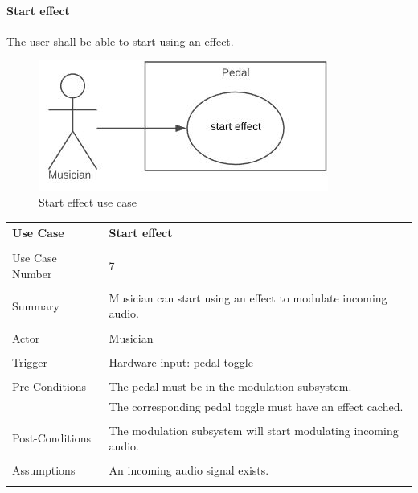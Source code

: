             \paragraph{Start effect} 
            The user shall be able to start using an effect.
            \begin{figure}[!ht]
                \centering
                \includegraphics[width=.5\textwidth]{diagrams/use_cases/uc-effect-start.JPG}
                \caption{Start effect use case}
                \label{fig:uc-start-effect}
            \end{figure}
            \clearpage
            \begin{table}[!ht]
                \centering
                \begin{tabular}{l l}
                    Use Case & Start effect \\
                    \hline \\
                    Use Case Number & 7 \\ \\
                    Summary & Musician can start using an effect to modulate incoming audio. \\ \\
                    Actor & Musician \\ \\
                    Trigger & Hardware input: pedal toggle \\ \\
                    Pre-Conditions & The pedal must be in the modulation subsystem. \\
                    & The corresponding pedal toggle must have an effect cached. \\ \\
                    Post-Conditions & The modulation subsystem will start modulating incoming audio. \\ \\
                    Assumptions & An incoming audio signal exists.\\ \\
                \end{tabular}
            \end{table}     
            
